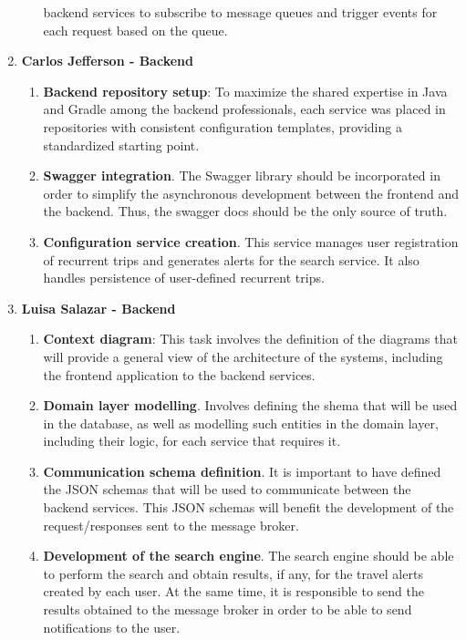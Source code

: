 \documentclass[../memory.tex]{subfiles}
\begin{document}
\begin{enumerate}[label =]
\begin{enumerate}[label = -]
		backend services to subscribe to message queues and trigger events for
		each request based on the queue.
	\end{enumerate}
	\item\textbf{Carlos Jefferson - Backend}
	\begin{enumerate}[label = -]
		\item\textbf{Backend repository setup}: To maximize the shared expertise
		in Java and Gradle among the backend professionals, each service was
		placed in repositories with consistent configuration templates,
		providing a standardized starting point.
		\item\textbf{Swagger integration}. The Swagger library should be
		incorporated in order to simplify the asynchronous development between
		the frontend and the backend. Thus, the swagger docs should be the
		only source of truth.
		\item\textbf{Configuration service creation}. This service manages user
		registration of recurrent trips and generates alerts for the search
		service. It also handles persistence of user-defined recurrent trips.
	\end{enumerate}
	\item\textbf{Luisa Salazar - Backend}
	\begin{enumerate}[label = -]
		\item\textbf{Context diagram}: This task involves the definition of the
		diagrams that will provide a general view of the architecture of the
		systems, including the frontend application to the backend services.
		\item\textbf{Domain layer modelling}. Involves defining the shema that
		will be used in the database, as well as modelling such entities in
		the domain layer, including their logic, for each service that
		requires it.
		\item\textbf{Communication schema definition}. It is important to have
		defined the JSON schemas that will be used to communicate between the
		backend services. This JSON schemas will benefit the development of
		the request/responses sent to the message broker.
		\item\textbf{Development of the search engine}. The search engine should
		be able to perform the search and obtain results, if any, for the
		travel alerts created by each user. At the same time, it is
		responsible to send the results obtained to the message broker in
		order to be able to send notifications to the user.
	\end{enumerate}
\end{enumerate}
\end{document}
